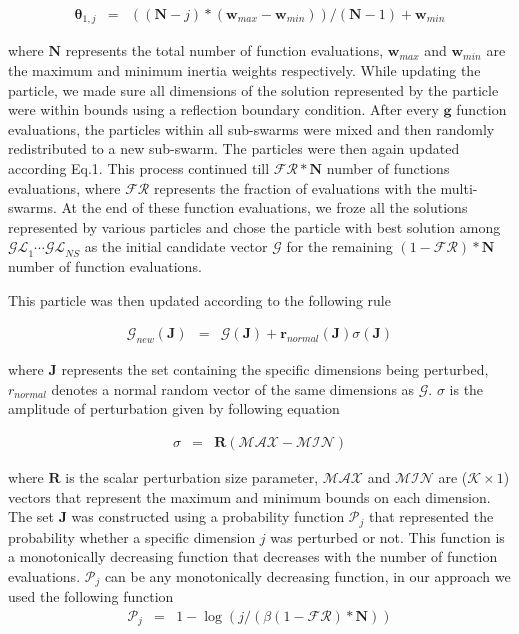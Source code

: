 \documentclass[12pt]{article}
\begin{document}
\begin{eqnarray}
	\mathbf \theta_{1,j}&=&((\mathbf{N}-{j})*(\mathbf{w}_{max}-\mathbf{w}_{min}))/(\mathbf{N}-{1}) + \mathbf{w}_{min}
\end{eqnarray}

where $\mathbf{N}$ represents the total number of function evaluations, $\mathbf{w}_{max}$ and $\mathbf{w}_{min}$ are the maximum and minimum inertia weights respectively. While updating the particle, we made sure all dimensions of the solution represented by the particle were within bounds using a reflection boundary condition. After every $\mathbf{g}$  function evaluations, the particles within all sub-swarms were mixed and then randomly redistributed to a new sub-swarm. The particles were then again updated according Eq.1. This process continued till $\mathcal{FR}*\mathbf{N}$ number of functions evaluations, where $\mathcal{FR}$ represents the fraction of evaluations with the multi-swarms. At the end of these function evaluations, we froze all the solutions represented by various particles and chose the particle with best solution among $\mathcal{GL}_{1} \cdots \mathcal{GL}_{NS}$ as the initial candidate vector $\mathcal{G}$ for the remaining $({1}-\mathcal{FR})*\mathbf{N}$ number of function evaluations.   

This particle was then updated according to the following rule 

\begin{eqnarray}
	\mathcal{G}_{new}(\mathbf{J})& = &\mathcal{G}(\mathbf{J})+\mathbf{r}_{normal}(\mathbf{J})\sigma(\mathbf{J})
\end{eqnarray}

where $\mathbf{J}$ represents the set containing the specific dimensions being perturbed, ${r}_{normal}$ denotes a normal random vector of the same dimensions as $\mathcal{G}$. $\sigma$ is the amplitude of perturbation given by following equation

\begin{eqnarray}
	\sigma& = &\mathbf{R}(\mathcal{MAX} -\mathcal{MIN})
\end{eqnarray}

where $\mathbf{R}$ is the scalar perturbation size parameter, $\mathcal{MAX}$ and $\mathcal{MIN}$ are ($\mathcal{K}\times{1}$) vectors that represent the maximum and minimum bounds on each dimension. The set $\mathbf{J}$ was constructed using a probability function $\mathcal{P}_{j}$ that represented the probability whether a specific dimension $j$ was perturbed or not.  This function is a monotonically decreasing function that decreases with the number of function evaluations. $\mathcal{P}_{j}$ can be any monotonically decreasing function, in our approach we used the following function
\begin{eqnarray}
	\mathcal{P}_{j}&=&{1}-\log(j/ (\beta({1}-\mathcal{FR})*\mathbf{N}))
\end{eqnarray}
\end{document}
